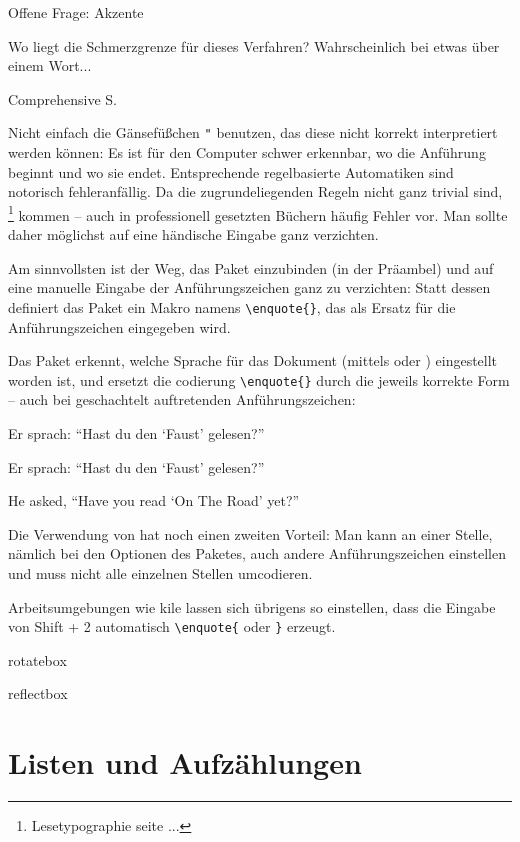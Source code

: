 Offene Frage: Akzente

Wo liegt die Schmerzgrenze für dieses Verfahren?
Wahrscheinlich bei etwas über einem Wort...

Comprehensive S.~


\label{enquote}

Nicht einfach die Gänsefüßchen \lstinline/"/ benutzen, das diese nicht korrekt interpretiert
werden können: Es ist für den Computer schwer erkennbar, wo die Anführung beginnt und wo sie
endet. Entsprechende regelbasierte Automatiken sind notorisch fehleranfällig.
Da die zugrundeliegenden Regeln nicht ganz trivial sind,
\footnote{Lesetypographie seite ...}
kommen -- auch in professionell gesetzten Büchern häufig Fehler vor.
Man sollte daher möglichst auf eine händische Eingabe ganz verzichten.

Am sinnvollsten ist der Weg, das Paket  einzubinden (in der Präambel) und auf 
eine manuelle Eingabe der Anführungszeichen ganz zu verzichten: Statt dessen definiert das Paket
ein Makro namens \lstinline/\enquote{}/, das als Ersatz für die Anführungszeichen eingegeben
wird.

Das Paket erkennt, welche Sprache für das Dokument (mittels  oder )
eingestellt worden ist, und ersetzt die codierung \lstinline/\enquote{}/ durch die 
jeweils korrekte Form -- auch bei geschachtelt auftretenden Anführungszeichen:

\begin{LTXexample}
Er sprach: \enquote{Hast du den \enquote{Faust} gelesen?} 

Er sprach: \enquote{Hast du den \enquote{Faust} gelesen?} 

He asked, \enquote{Have you read \enquote{On The Road} yet?} 
\end{LTXexample}

Die Verwendung von  hat noch einen zweiten Vorteil:
Man kann an einer Stelle, nämlich bei den Optionen des Paketes, auch andere Anführungszeichen 
einstellen und muss nicht alle einzelnen Stellen umcodieren.

Arbeitsumgebungen wie kile lassen sich übrigens so einstellen, dass die Eingabe von Shift + 2
automatisch \lstinline/\enquote{/ oder \lstinline/}/ erzeugt.


rotatebox

reflectbox


\section{Listen und Aufzählungen}

